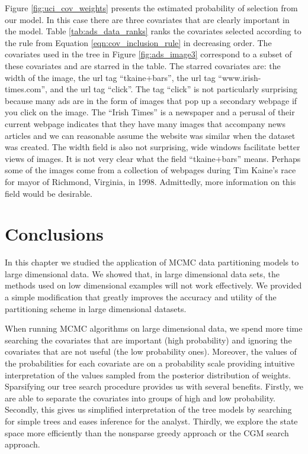 Figure \ref{fig:uci_cov_weights} presents the estimated  probability of selection from our model. In this case there are three covariates that are clearly important in the model. Table \ref{tab:ads_data_ranks} ranks the covariates selected according to the rule from Equation \ref{eqn:cov_inclusion_rule} in decreasing order. The covariates used in the tree in Figure \ref{fig:ads_image3} correspond to a subset of these covariates and are starred in the table. The starred covariates are: the width of the image, the url tag ``tkaine+bars'', the url tag ``www.irish-times.com'', and the url tag ``click''. The tag ``click'' is not particularly surprising because many ads are in the form of images that pop up a secondary webpage if you click on the image. The ``Irish Times'' is a newspaper and a perusal of their current webpage indicates that they have many images that accompany news articles and we can reasonable assume the website was similar when the dataset was created. The width field is also not surprising, wide windows facilitate better views of images. It is not very clear what the field ``tkaine+bars'' means. Perhaps some of the images come from a collection of webpages during Tim Kaine's race for mayor of Richmond, Virginia, in 1998. Admittedly, more information on this field would be desirable. 
 
\section{Conclusions}\label{sec:conc}
In this chapter we studied the application of MCMC data partitioning models to large dimensional data. We showed that, in large dimensional data sets, the methods used on low dimensional examples will not work effectively. We provided a simple modification that greatly improves the accuracy and utility of the partitioning scheme in large dimensional datasets. 

 When running MCMC algorithms on large dimensional data, we spend more time searching the covariates that are important (high probability) and ignoring the covariates that are not useful (the low probability ones). Moreover, the values of the probabilities for each covariate are on a probability scale providing intuitive interpretation of the values sampled from the posterior distribution of weights.
Sparsifying our tree search procedure provides us with several benefits. Firstly, we are able to separate the covariates into groups of high and low probability. Secondly, this gives us simplified interpretation of the tree models by searching for simple trees and eases inference for the analyst. Thirdly, we explore the state space more efficiently than the nonsparse greedy approach or the CGM search approach. 

